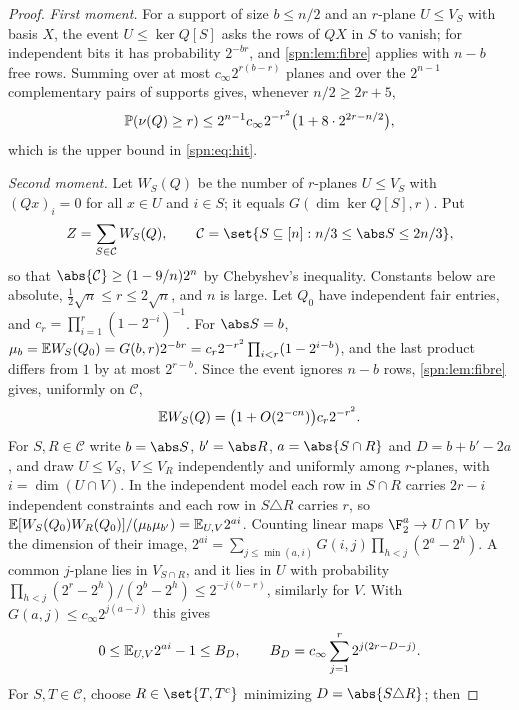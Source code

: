 \begin{proof}
\emph{First moment.} For a support of size $b\le n/2$ and an $r$-plane $U\le V_S$ with basis
$X$, the event $U\le\ker Q[S]$ asks the rows of $QX$ in $S$ to vanish; for independent bits it
has probability $2^{-br}$, and \cref{spn:lem:fibre} applies with $n-b$ free rows. Summing over
at most $c_\infty2^{r(b-r)}$ planes and over the $2^{n-1}$ complementary pairs of supports gives,
whenever $n/2\ge2r+5$,
\begin{equation}\label{spn:eq:upper}
 \mathbb{P}(\nu(Q)\ge r)\le2^{n-1}c_\infty2^{-r^2}\bigl(1+8\cdot2^{2r-n/2}\bigr),
\end{equation}
which is the upper bound in \eqref{spn:eq:hit}.

\emph{Second moment.} Let $W_S(Q)$ be the number of $r$-planes $U\le V_S$ with $(Qx)_i=0$ for
all $x\in U$ and $i\in S$; it equals $G(\dim\ker Q[S],r)$. Put
\[
 Z=\sum_{S\in\mathcal C}W_S(Q),\qquad\mathcal C=\set{S\subseteq[n]:n/3\le\abs S\le2n/3},
\]
so that $\abs{\mathcal C}\ge(1-9/n)2^n$ by Chebyshev's inequality. Constants below are
absolute, $\tfrac12\sqrt n\le r\le2\sqrt n$, and $n$ is large. Let $Q_0$ have independent fair
entries, and $c_r=\prod_{i=1}^r(1-2^{-i})^{-1}$. For $\abs S=b$,
$\mu_b=\mathbb{E} W_S(Q_0)=G(b,r)2^{-br}=c_r2^{-r^2}\prod_{i<r}(1-2^{i-b})$, and the last product
differs from $1$ by at most $2^{r-b}$. Since the event ignores $n-b$ rows,
\cref{spn:lem:fibre} gives, uniformly on $\mathcal C$,
\begin{equation}\label{spn:eq:onecentral}
 \mathbb{E} W_S(Q)=\bigl(1+O(2^{-cn})\bigr)c_r2^{-r^2}.
\end{equation}
For $S,R\in\mathcal C$ write $b=\abs S$, $b'=\abs R$, $a=\abs{S\cap R}$ and $D=b+b'-2a$, and
draw $U\le V_S$, $V\le V_R$ independently and uniformly among $r$-planes, with
$i=\dim(U\cap V)$. In the independent model each row in $S\cap R$ carries $2r-i$ independent
constraints and each row in $S\triangle R$ carries $r$, so
$\mathbb{E}[W_S(Q_0)W_R(Q_0)]/(\mu_b\mu_{b'})=\mathbb{E}_{U,V}2^{ai}$. Counting linear maps
$\F_2^a\to U\cap V$ by the dimension of their image,
$2^{ai}=\sum_{j\le\min(a,i)}G(i,j)\prod_{h<j}(2^a-2^h)$. A common $j$-plane lies in
$V_{S\cap R}$, and it lies in $U$ with probability
$\prod_{h<j}(2^r-2^h)/(2^b-2^h)\le2^{-j(b-r)}$, similarly for $V$. With
$G(a,j)\le c_\infty2^{j(a-j)}$ this gives
\begin{equation}\label{spn:eq:overlap}
 0\le\mathbb{E}_{U,V}2^{ai}-1\le B_D,\qquad B_D=c_\infty\sum_{j=1}^r2^{j(2r-D-j)}.
\end{equation}
For $S,T\in\mathcal C$, choose $R\in\set{T,T^c}$ minimizing $D=\abs{S\triangle R}$; then

\end{proof}
